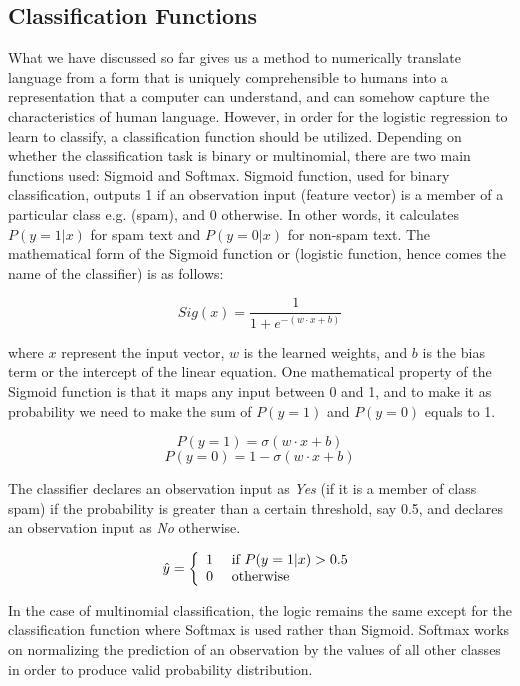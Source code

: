 \subsection{Classification Functions}
What we have discussed so far gives us a method to numerically translate language from a form that is uniquely comprehensible to humans into a representation that a computer can understand, and can somehow capture the characteristics of human language. However, in order for the logistic regression to learn to classify, a classification function should be utilized. Depending on whether the classification task is binary or multinomial, there are two main functions used: Sigmoid and Softmax. Sigmoid function, used for binary classification, outputs 1 if an observation input (feature vector) is a member of a particular class e.g. (spam), and 0 otherwise. In other words, it calculates $P(y=1|x)$ for spam text and $P(y=0|x)$ for non-spam text. The mathematical form of the Sigmoid function or (logistic function, hence comes the name of the classifier) is as follows:

$$Sig ( x ) = \frac { 1 } { 1 + e ^ { - (w \cdot x +b)} }$$ 

where $x$ represent the input vector, $w$ is the learned weights, and $b$ is the bias term or the intercept of the linear equation. One mathematical property of the Sigmoid function is that it maps any input between 0 and 1, and to make it as probability we need to make the sum of $P(y=1)$ and $P(y=0)$ equals to 1. 

$$ P ( y = 1 ) = \sigma ( w \cdot x + b ) $$
$$ P ( y = 0 ) = 1 - \sigma ( w \cdot x + b ) $$

The classifier declares an observation input as \emph{Yes} (if it is a member of class spam) if the probability is greater than a certain threshold, say 0.5, and declares an observation input as \emph{No} otherwise. 

$$  \hat { y } = \left\{ \begin{array} { l l } { 1 } & { \text { if } P ( y = 1 | x ) > 0.5 } \\ { 0 } & { \text { otherwise } } \end{array} \right.  $$


In the case of multinomial classification, the logic remains the same except for the classification function where Softmax is used rather than Sigmoid. Softmax works on normalizing the prediction of an observation by the values of all other classes in order to produce valid probability distribution. 

